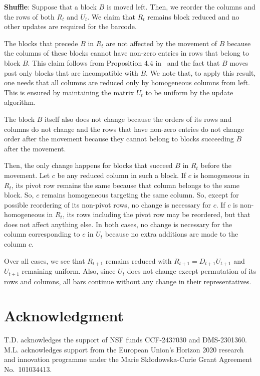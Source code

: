 \documentclass[letterpaper,11pt]{article}
\theoremstyle{plain}
\theoremstyle{definition}
\newcounter{li}
\begin{document}
\textbf{Shuffle}:
Suppose that a block $B$ is moved left. Then, we reorder the columns and the rows 
of both $R_t$ and $U_t$. We claim that $R_t$ remains block reduced and no other
updates are required for the barcode.

The blocks that precede $B$ in $R_{t}$ are not affected by the movement of $B$ because the columns of these blocks cannot have non-zero entries in rows that belong to block $B$.
This claim follows from Proposition 4.4 in~\cite{DeHaLi2026} and the fact that $B$ moves past only blocks that are incompatible
with $B$. We note that, to apply
this result, one needs that all columns are reduced only by homogeneous columns from
left. This is ensured by 
maintaining the matrix $U_t$ to be uniform by the update algorithm.  

 The block $B$ itself also does not change because the orders of its rows and columns do not change and the rows that have non-zero entries do not change order after the movement because they cannot belong to blocks succeeding $B$ after the movement.

Then, the only change happens for blocks that succeed $B$ in $R_t$ before the movement. Let $c$ be any reduced column in such a block. If $c$ is homogeneous in $R_t$, its pivot row remains the same because that column belongs to the same block. So, $c$ remains homogeneous
targeting the same column. So, except for possible reordering of its non-pivot
rows, no change is necessary for $c$. If $c$ is non-homogeneous in $R_t$, its rows including the pivot row may be reordered, but that does not affect anything else. 
In both cases, no change is necessary for the column corresponding to $c$ in $U_t$ because no extra additions are made to the column $c$. 

Over all cases, we see that $R_{t+1}$ remains reduced with $R_{t+1}=D_{t+1}U_{t+1}$ and
$U_{t+1}$ remaining uniform. Also, since $U_t$ does not change except permutation of its rows and columns, all bars continue without any change in their representatives.

\section*{Acknowledgment}
 T.D. acknowledges the support of NSF funds CCF-2437030 and DMS-2301360. M.L. acknowledges support from the European Union’s Horizon 2020 research and innovation programme under the Marie Skło\-dow\-ska-Curie Grant Agreement No.~101034413.


\end{document}
